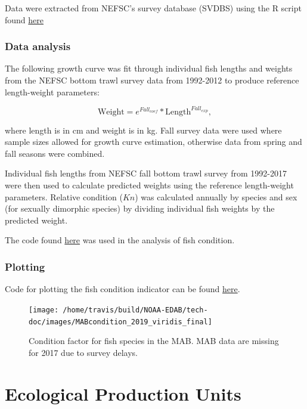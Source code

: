 \documentclass[
]{book}
\begin{document}
Data were extracted from NEFSC's survey database (SVDBS) using the R script found \href{https://github.com/Laurels1/Condition/blob/master/R/pull_from_svdbs.R}{here}

\hypertarget{data-analysis-11}{%
\subsection{Data analysis}\label{data-analysis-11}}

The following growth curve was fit through individual fish lengths and weights from the NEFSC bottom trawl survey data from 1992-2012 to produce reference length-weight parameters:

\[\textrm{Weight} = e^{Fall_{coef}} * \textrm{Length}^{Fall_{exp}},\]

where length is in cm and weight is in kg. Fall survey data were used where sample sizes allowed for growth curve estimation, otherwise data from spring and fall seasons were combined.

Individual fish lengths from NEFSC fall bottom trawl survey from 1992-2017 were then used to calculate predicted weights using the reference length-weight parameters. Relative condition (\(Kn\)) was calculated annually by species and sex (for sexually dimorphic species) by dividing individual fish weights by the predicted weight.

The code found \href{https://github.com/Laurels1/Condition/blob/master/R/RelConditionEPU.R}{here} was used in the analysis of fish condition.

\hypertarget{plotting-8}{%
\subsection{Plotting}\label{plotting-8}}

Code for plotting the fish condition indicator can be found \href{https://github.com/Laurels1/Condition/blob/master/R/Condition_plot_viridis_final.R}{here}.

\begin{figure}
\texttt{[image: /home/travis/build/NOAA-EDAB/tech-doc/images/MABcondition\_2019\_viridis\_final]} \caption{ Condition factor for fish species in the MAB. MAB data are missing for 2017 due to survey delays.}\label{fig:unnamed-chunk-15}
\end{figure}

\hypertarget{epu}{%
\chapter{Ecological Production Units}\label{epu}}
\end{document}

